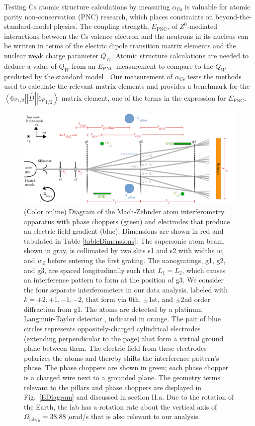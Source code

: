 \documentclass[twocolumn,pra,showpacs,superscriptaddress,longbibliography]{revtex4-1}   %
\newcommand{\brakett}[3]{\left.\left\langle #1 \right|\right|#2\left|\left| #3 \right\rangle\right.}
\newcommand{\figref}[1]{Fig.~\ref{#1}}
\newcommand{\acs}{\alpha_{\textrm{Cs}}}
\newcommand{\Omegalab}{\Omega_{\mathrm{lab},y}}
\begin{document}
Testing Cs atomic structure calculations by measuring $\acs$ is valuable for atomic parity non-conservation (PNC) research, which places constraints on beyond-the-standard-model physics. The coupling strength, $E_{\mathrm{PNC}}$, of $Z^0$-mediated interactions between the Cs valence electron and the neutrons in its nucleus can be written in terms of the electric dipole transition matrix elements and the nuclear weak charge parameter $Q_W$. Atomic structure calculations are needed to deduce a value of $Q_W$ from an $E_{\mathrm{PNC}}$ measurement \cite{Blundell1992,Cho1997,Derevianko2001,Porsev2009} to compare to the $Q_W$ predicted by the standard model \cite{Bouchiat1999,Dzuba2012}. Our measurement of $\acs$ tests the methods used to calculate the relevant matrix elements and provides a benchmark for the $\brakett{6s_{1/2}}{\hat{D}}{6p_{1/2}}$ matrix element, one of the terms in the expression for $E_{\mathrm{PNC}}$.

\begin{figure}
\includegraphics[width=\linewidth,keepaspectratio]{IFM_diagram2.pdf}
\caption{\label{IFMDiagram}(Color online) Diagram of the Mach-Zehnder atom interferometry apparatus with phase choppers (green) and electrodes that produce an electric field gradient (blue). Dimensions are shown in red and tabulated in Table \ref{tableDimensions}.  The supersonic atom beam, shown in gray, is collimated by two slits s1 and s2 with widths $w_1$ and $w_2$ before entering the first grating. 
The nanogratings, g1, g2, and g3, are spaced longitudinally such that $L_1 = L_2$, which causes an interference pattern to form at the position of g3.
We consider the four separate interferometers in our data analysis, labeled with $k=+2,+1,-1,-2$, that form via 0th, $\pm$1st, and $\pm$2nd order diffraction from g1.
The atoms are detected by a platinum Langmuir-Taylor detector \cite{Delhuille2002}, indicated in orange.
The pair of blue circles represents oppositely-charged cylindrical electrodes (extending perpendicular to the page) that form a virtual ground plane between them. The electric field from these electrodes polarizes the atoms and thereby shifts the interference pattern's phase. 
The phase choppers are shown in green; each phase chopper is a charged wire next to a grounded plane. The geometry terms relevant to the pillars and phase choppers are displayed in \figref{EDiagram} and discussed in section II.a.
Due to the rotation of the Earth, the lab has a rotation rate about the vertical axis of $\Omegalab = 38.88$ $\mu$rad/s that is also relevant to our analysis.  }
\end{figure}
\end{document}
